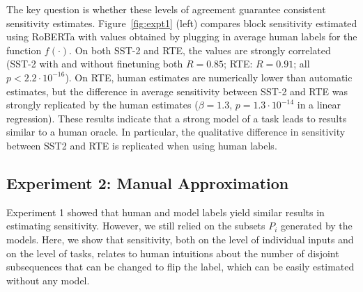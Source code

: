 \documentclass[11pt,a4paper]{article}
\begin{document}
The key question is whether these levels of agreement guarantee consistent sensitivity estimates.
Figure~\ref{fig:expt1} (left) compares block sensitivity estimated using RoBERTa with values obtained by plugging in average human labels for the function $f(\cdot)$.
On both SST-2 and RTE, the values are strongly correlated (SST-2 with and without finetuning both $R=0.85$; RTE: $R=0.91$; all $p < 2.2\cdot 10^{-16}$). 
On RTE, human estimates are numerically lower than automatic estimates, but the difference in average sensitivity between SST-2 and RTE was strongly replicated by the human estimates ($\beta=1.3$, $p=1.3 \cdot 10^{-14}$ in a linear regression).
These results indicate that a strong model of a task leads to results similar to a human oracle. 
In particular, the qualitative difference in sensitivity between SST2 and RTE is replicated when using human labels.



\subsection{Experiment 2: Manual Approximation}
Experiment 1 showed that human and model labels yield similar results in estimating sensitivity.
However, we still relied on the subsets $P_i$ generated by the models.
Here, we show that sensitivity, both on the level of individual inputs and on the level of tasks, relates to human intuitions about the number of disjoint subsequences that can be changed to flip the label, which can be easily estimated without any model.


\end{document}
